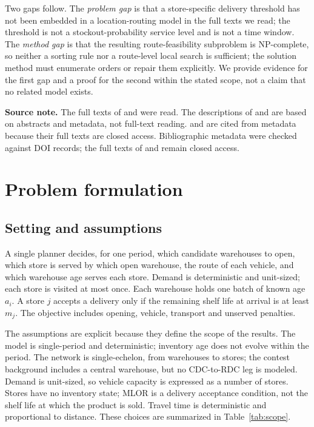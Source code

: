 \documentclass[preprint,12pt]{elsarticle}
\begin{document}
Two gaps follow. The \emph{problem gap} is that a store-specific delivery threshold has not been embedded in a location-routing model in the full texts we read; the threshold is not a stockout-probability service level and is not a time window. The \emph{method gap} is that the resulting route-feasibility subproblem is NP-complete, so neither a sorting rule nor a route-level local search is sufficient; the solution method must enumerate orders or repair them explicitly. We provide evidence for the first gap and a proof for the second within the stated scope, not a claim that no related model exists.

\textbf{Source note.} The full texts of \citet{crama2018} and \citet{rohmer2019} were read. The descriptions of \citet{coelho2014} and \citet{govindan2014} are based on abstracts and metadata, not full-text reading. \citet{qiu2019} and \citet{singh2022} are cited from metadata because their full texts are closed access. Bibliographic metadata were checked against DOI records; the full texts of \citet{qiu2019} and \citet{singh2022} remain closed access.

\section{Problem formulation}

\subsection{Setting and assumptions}

A single planner decides, for one period, which candidate warehouses to open, which store is served by which open warehouse, the route of each vehicle, and which warehouse age serves each store. Demand is deterministic and unit-sized; each store is visited at most once. Each warehouse holds one batch of known age $a_i$. A store $j$ accepts a delivery only if the remaining shelf life at arrival is at least $m_j$. The objective includes opening, vehicle, transport and unserved penalties.

The assumptions are explicit because they define the scope of the results. The model is single-period and deterministic; inventory age does not evolve within the period. The network is single-echelon, from warehouses to stores; the contest background includes a central warehouse, but no CDC-to-RDC leg is modeled. Demand is unit-sized, so vehicle capacity is expressed as a number of stores. Stores have no inventory state; MLOR is a delivery acceptance condition, not the shelf life at which the product is sold. Travel time is deterministic and proportional to distance. These choices are summarized in Table~\ref{tab:scope}.
\end{document}

